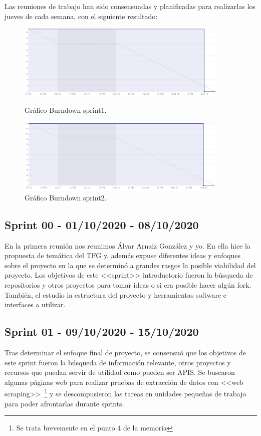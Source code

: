 Las reuniones de trabajo han sido consensuadas y planificadas para realizarlas los jueves de cada semana, con el siguiente resultado:

\begin{figure}
    \centering
    \includegraphics[width=0.9\textwidth]{img/BurnDown/1.PNG}
    \caption{Gráfico Burndown sprint1. } \label{BD1}
    \includegraphics[width=0.9\textwidth]{img/BurnDown/2.PNG}
    \caption{Gráfico Burndown sprint2. } \label{BD2}
\end{figure}

\subsection{Sprint 00 - 01/10/2020 - 08/10/2020}
En la primera reunión nos reunimos Álvar Arnaiz González y yo. En ella hice la propuesta de temática del TFG y, además expuse diferentes ideas y enfoques sobre el proyecto en la que se determinó a grandes rasgos la posible viabilidad del proyecto.
Los objetivos de este <<sprint>> introductorio fueron la búsqueda de repositorios y otros proyectos para tomar ideas o si era posible hacer algún fork. También, el estudio la estructura del proyecto y herramientas software e interfaces a utilizar.

\subsection{Sprint 01 - 09/10/2020 - 15/10/2020}
Tras determinar el enfoque final de proyecto, se consensuó que los objetivos de este sprint fueron la búsqueda de información relevante, otros proyectos y recursos que puedan servir de utilidad como pueden ser APIS. Se buscaron algunas páginas web para realizar pruebas de extracción de datos con <<web scraping>>~\footnote{Se trata brevemente en el punto 4 de la memoria} y se descompusieron las tareas en unidades pequeñas de trabajo para poder afrontarlas durante sprints.

